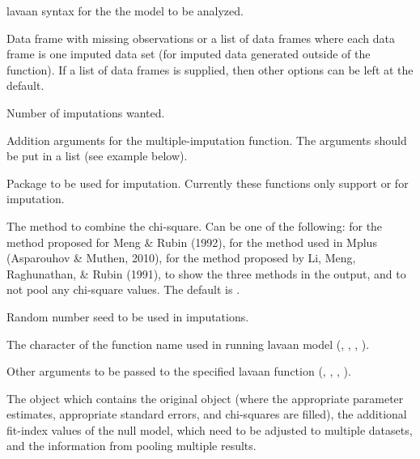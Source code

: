 \documentclass[a4paper]{book}
\begin{document}
%
\begin{Arguments}
\begin{ldescription}
\item[\code{model}] 
lavaan syntax for the the model to be analyzed. 

\item[\code{data}] 
Data frame with missing observations or a list of data frames where each data frame is one imputed data set (for imputed data generated outside of the function). If a list of data frames is supplied, then other options can be left at the default.

\item[\code{m}] 
Number of imputations wanted.

\item[\code{miArgs}] 
Addition arguments for the multiple-imputation function. The arguments should be put in a list (see example below).

\item[\code{miPackage}] 
Package to be used for imputation. Currently these functions only support  or  for imputation. 

\item[\code{chi}] 
The method to combine the chi-square. Can be one of the following:  for the method proposed for Meng \& Rubin (1992),  for the method used in Mplus (Asparouhov \& Muthen, 2010),  for the method proposed by Li, Meng, Raghunathan, \& Rubin (1991),   to show the three methods in the output, and  to not pool any chi-square values. The default is . 

\item[\code{seed}] 
Random number seed to be used in imputations.

\item[\code{fun}] 
The character of the function name used in running lavaan model (, , , ). 

\item[\code{...}] 
Other arguments to be passed to the specified lavaan function (, , , ).

\end{ldescription}
\end{Arguments}
%
\begin{Value}
The  object which contains the original  object (where the appropriate parameter estimates, appropriate standard errors, and chi-squares are filled), the additional fit-index values of the null model, which need to be adjusted to multiple datasets, and the information from pooling multiple results.
\end{Value}
\end{document}
